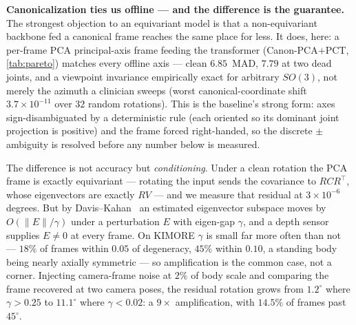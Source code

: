 \documentclass[10pt,twocolumn,letterpaper]{article}
\begin{document}
\textbf{Canonicalization ties us offline --- and the difference is the guarantee.} The strongest
objection to an equivariant model is that a non-equivariant backbone fed a canonical frame reaches the
same place for less. It does, here: a per-frame PCA principal-axis frame feeding the transformer
(Canon-PCA$+$PCT, \cref{tab:pareto}) matches every offline axis --- clean $6.85$~MAD, $7.79$ at two dead
joints, and a viewpoint invariance empirically exact for arbitrary $SO(3)$, not merely the azimuth a
clinician sweeps (worst canonical-coordinate shift $3.7\times10^{-11}$ over $32$ random rotations).
This is the baseline's strong form: axes sign-disambiguated by a deterministic rule (each oriented so
its dominant joint projection is positive) and the frame forced right-handed, so the discrete $\pm$
ambiguity is resolved before any number below is measured.

The difference is not accuracy but \emph{conditioning}. Under a clean rotation the PCA frame is exactly
equivariant --- rotating the input sends the covariance to $RCR^{\!\top}$, whose eigenvectors are
exactly $RV$ --- and we measure that residual at $3\times10^{-6}$ degrees. But by
Davis--Kahan~\cite{daviskahan1970} an estimated eigenvector subspace moves by $O(\lVert E\rVert/\gamma)$
under a perturbation $E$ with eigen-gap $\gamma$, and a depth sensor supplies $E\neq0$ at every frame.
On KIMORE $\gamma$ is small far more often than not --- $18\%$ of frames within $0.05$ of degeneracy,
$45\%$ within $0.10$, a standing body being nearly axially symmetric --- so amplification is the
common case, not a corner. Injecting camera-frame noise at $2\%$ of body scale and comparing the frame
recovered at two camera poses, the residual rotation grows from $1.2^\circ$ where $\gamma>0.25$ to
$11.1^\circ$ where $\gamma<0.02$: a $9\times$ amplification, with $14.5\%$ of frames past $45^\circ$.
\end{document}
